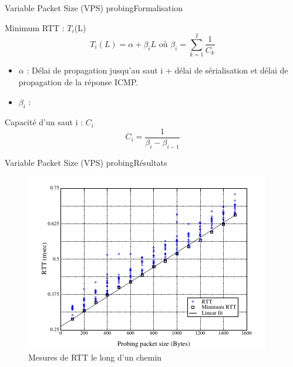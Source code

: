 \documentclass[compress]{beamer}
\begin{document}
\begin{frame}{Variable Packet Size (VPS) probing}{Formalisation}
	\begin{block}{Minimum RTT : $T_i$(L)}
	$$T_{i}(L) = \alpha + \beta_{i}L \text{ où } \beta_i = \sum^{I}_{k=1} \frac{1}{C_k}$$
	\end{block}
\begin{itemize}
	\item $\alpha$ : Délai de propagation jusqu'au saut i + délai de 	sérialisation et délai de propagation de la réponse ICMP.
	\item $\beta_i$ : %
\end{itemize}

\begin{block}{Capacité d'un saut i : $C_i$}
	$$ C_i = \frac{1}{\beta_i - \beta_{i-1}} $$
\end{block}
\end{frame}


\begin{frame}{Variable Packet Size (VPS) probing}{Résultats}
	\begin{figure}[hbtp]
		\centering
		\includegraphics[scale=0.7]{schema4.png}
		\caption{Mesures de RTT le long d'un chemin}
	\end{figure}
\end{frame}
\end{document}
